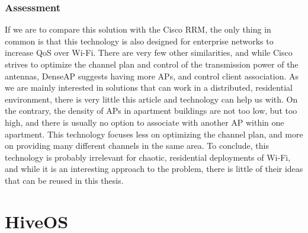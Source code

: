 \subsubsection{Assessment}
If we are to compare this solution with the Cisco RRM, the only thing in common is that this technology is also designed for enterprise networks to increase QoS over Wi-Fi. There
are very few other similarities, and while Cisco strives to optimize the channel plan and control of the transmission power of the antennas, DenseAP suggests having more APs, and control client association. As we are mainly interested in solutions that can work in a distributed, residential environment, there is very little this article and technology can help us with. 
On the contrary, the density of APs in apartment buildings are not too low, but too high, and there is usually no option to associate with another AP within one apartment.
This technology focuses less on optimizing the channel plan, and more on providing many different channels in the same area.  
To conclude, this technology is probably irrelevant for chaotic, residential deployments of Wi-Fi, and while it is an interesting approach to the problem, there is little of their
ideas that can be reused in this thesis. 


\section{HiveOS}
